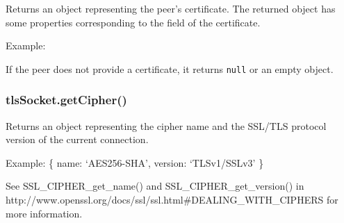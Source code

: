 Returns an object representing the peer's certificate. The returned
object has some properties corresponding to the field of the
certificate.

Example:

\begin{Shaded}
\begin{Highlighting}[]
\NormalTok{\{ }\NormalTok{: }
   \NormalTok{\{ }\NormalTok{: }\NormalTok{,}
     \NormalTok{: }\NormalTok{,}
     \NormalTok{: }\NormalTok{,}
     \NormalTok{: }\NormalTok{,}
     \NormalTok{: }\NormalTok{,}
     \NormalTok{: } \NormalTok{\},}
  \NormalTok{: }
   \NormalTok{\{ }\NormalTok{: }\NormalTok{,}
     \NormalTok{: }\NormalTok{,}
     \NormalTok{: }\NormalTok{,}
     \NormalTok{: }\NormalTok{,}
     \NormalTok{: }\NormalTok{,}
     \NormalTok{: } \NormalTok{\},}
  \NormalTok{: }\NormalTok{,}
  \NormalTok{: }\NormalTok{,}
  \NormalTok{: }\NormalTok{,}
  \NormalTok{: } \NormalTok{\}}
\end{Highlighting}
\end{Shaded}

If the peer does not provide a certificate, it returns \texttt{null} or
an empty object.

\subsubsection{tlsSocket.getCipher()}\label{tlssocket.getcipher}

Returns an object representing the cipher name and the SSL/TLS protocol
version of the current connection.

Example: \{ name: `AES256-SHA', version: `TLSv1/SSLv3' \}

See SSL\_CIPHER\_get\_name() and SSL\_CIPHER\_get\_version() in
http://www.openssl.org/docs/ssl/ssl.html\#DEALING\_WITH\_CIPHERS for
more information.

